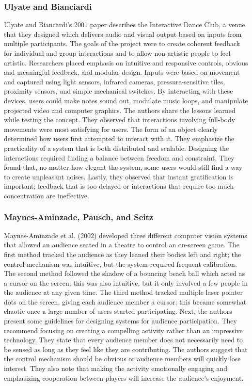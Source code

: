 \subsubsection{Ulyate and Bianciardi}

Ulyate and Biancardi's 2001 paper describes the Interactive Dance Club, a venue that they designed which delivers audio and visual output based on inputs from multiple participants. The goals of the project were to create coherent feedback for individual and group interactions and to allow non-artistic people to feel artistic. Researchers placed emphasis on intuitive and responsive controls, obvious and meaningful feedback, and modular design. Inputs were based on movement and captured using light sensors, infrared cameras, pressure-sensitive tiles, proximity sensors, and simple mechanical switches. By interacting with these devices, users could make notes sound out, modulate music loops, and manipulate projected video and computer graphics. The authors share the lessons learned while testing the concept. They observed that interactions involving full-body movements were most satisfying for users. The form of an object clearly determined how users first attempted to interact with it. They emphasize the practicality of a system that is both distributed and scalable. Designing the interactions required finding a balance between freedom and constraint. They found that, no matter how elegant the system, some users would still find a way to create unpleasant noises. Lastly, they observed that instant gratification is important; feedback that is too delayed or interactions that require too much concentration are ineffective.

\subsubsection{Maynes-Aminzade, Pausch, and Seitz}

Maynes-Aminzade et al. (2002) developed three different computer vision systems that allowed an audience seated in a theatre to control an on-screen game. The first method tracked the audience as they leaned their bodies left and right; the control mechanism was intuitive, but the system required frequent calibration. The second method followed the shadow of a bouncing beach ball which acted as a cursor on the screen; this was also intuitive, but it only involved a few people in the audience at any given time. The third method tracked multiple laser pointer dots on the screen, giving each audience member a cursor; this became somewhat chaotic once a large number of users started participating. Next, the authors present some guidelines for designing systems for audience participation. They recommend focusing on creating a compelling activity rather than an impressive technology. They state that every audience member does not necessarily need to be sensed as long as they feel like they are contributing. The authors suggest that the control mechanism should be obvious or audience members will quickly lose interest. They also note that making the activity emotionally engaging and emphasizing cooperation between players will increase the audience's enjoyment.

